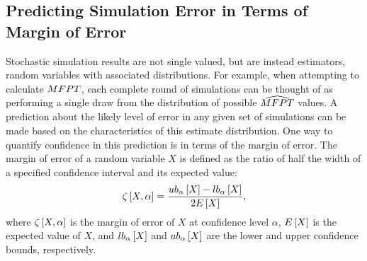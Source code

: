 
\subsection{Predicting Simulation Error in Terms of Margin of Error}
%

Stochastic simulation results are not single valued, but are instead estimators, random variables with associated distributions. For example, when attempting to calculate $MFPT$, each complete round of simulations can be thought of as performing a single draw from the distribution of possible $\widehat{MFPT}$ values. A prediction about the likely level of error in any given set of simulations can be made based on the characteristics of this estimate distribution. One way to quantify confidence in this prediction is in terms of the margin of error. The margin of error of a random variable $X$ is defined as the ratio of half the width of a specified confidence interval and its expected value:
    \begin{equation}
    \label{eq:moe_definition}
        \zeta \left[ X, \alpha \right] = \frac{ub_{\alpha} \left[ X \right] - lb_{\alpha} \left[ X \right]}{2 E \left[ X \right]},
    \end{equation}
where $\zeta \left[ X, \alpha \right]$ is the margin of error of $X$ at confidence level $\alpha$, $E \left[ X \right]$ is the expected value of $X$, and $lb_{\alpha} \left[ X \right]$ and $ub_{\alpha} \left[ X \right]$ are the lower and upper confidence bounds, respectively. 

